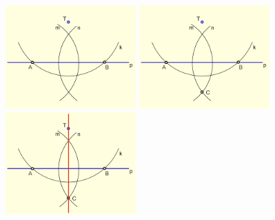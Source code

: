 \begin{frame}
\begin{columns}
		  {\includegraphics[width=50mm]{slike/fig-5.png}}
		 \only<6> {\includegraphics[width=50mm]{slike/fig-6.png}}
		 \only<7> {\includegraphics[width=50mm]{slike/fig-7.png}}
	\end{columns}
\end{frame}


				
